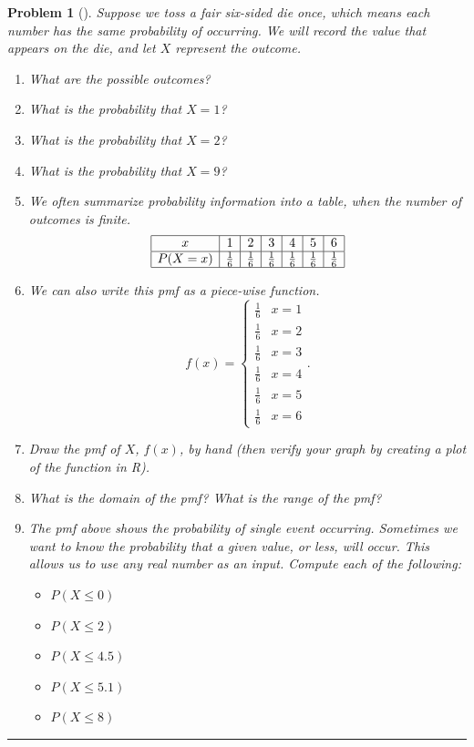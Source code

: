 \documentclass[letterpaper,oneside]{book}%
\theoremstyle{plain}
\theoremstyle{box}
\theoremstyle{problem}
\newtheorem{problemnum}{Problem}[chapter]
\newenvironment{problem}[1][]{\begin{problemnum}[#1]}{\end{problemnum}\nopagebreak\hrule\bigskip}
\begin{document}
\begin{problem}
 Suppose we toss a fair six-sided die once, which means each number has the same probability of occurring. 
 We will record the value that appears on the die, and let $X$ represent the outcome. 
 \begin{enumerate}
  \item What are the possible outcomes?  
  \item What is the probability that $X=1$?   
  \item What is the probability that $X=2$?   
  \item What is the probability that $X=9$?   
  \item We often summarize probability information into a table, when the number of outcomes is finite. 
    $$\begin{array}{|c|c|c|c|c|c|c|}\hline
    x & 1&2&3&4&5&6\\\hline
    P(X=x) & \frac{1}{6} &\frac{1}{6} &\frac{1}{6} &\frac{1}{6} &\frac{1}{6} & \frac{1}{6}\\\hline
    \end{array}$$
  \item We can also write this pmf as a piece-wise function.
  $$f(x) = 
    \begin{cases}
    \frac{1}{6} & x=1 \\
    \frac{1}{6} & x=2 \\
    \frac{1}{6} & x=3 \\
    \frac{1}{6} & x=4 \\
    \frac{1}{6} & x=5 \\
    \frac{1}{6} & x=6
    \end{cases}.$$
  \item Draw the pmf of $X$, $f(x)$, by hand (then verify your graph by creating a plot of the function in R).
  \item What is the domain of the pmf?  What is the range of the pmf?
  \item The pmf above shows the probability of single event occurring. Sometimes we want to know the probability that a given value, or less, will occur. This allows us to use any real number as an input. Compute each of the following: 
  \begin{itemize}
   \item $P(X\leq 0)$
   \item $P(X\leq 2)$
   \item $P(X\leq 4.5)$
   \item $P(X\leq 5.1)$
   \item $P(X\leq 8)$

\end{itemize}
\end{enumerate}
\end{problem}
\end{document}
